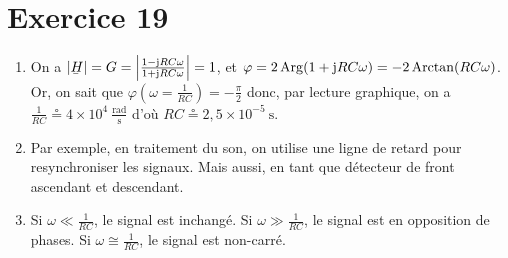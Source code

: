 \section{Exercice 19}

\begin{enumerate}
	\item On a $|\ubar{H}| = G = \left|\frac{1 - \mathrm{j}RC\omega}{1 + \mathrm{j}RC\omega}\right| = 1$, et $\varphi = 2\operatorname{Arg}(1 + \mathrm{j}RC\omega) = -2\operatorname{Arctan}(RC\omega)$. Or, on sait que $\varphi\left( \omega = \frac{1}{RC} \right) = -\frac{\pi}{2}$\/ donc, par lecture graphique, on a $\frac{1}{RC} \circeq 4 \times 10^{4} \:\mathrm{\frac{rad}{s}}$\/ d'où $RC \circeq 2{,}5\times 10^{-5}\:\mathrm{s}$.
	\item Par exemple, en traitement du son, on utilise une ligne de retard pour resynchroniser les signaux.
		Mais aussi, en tant que détecteur de front ascendant et descendant.
	\item Si $\omega \ll \frac{1}{RC}$, le signal est inchangé. Si $\omega \gg \frac{1}{RC}$, le signal est en opposition de phases. Si $\omega \cong \frac{1}{RC}$, le signal est non-carré.
\end{enumerate}

